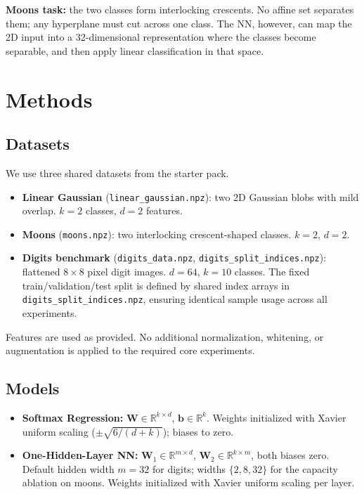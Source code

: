 \documentclass[11pt]{article}
\newcommand{\R}{\mathbb{R}}
\newcommand{\vb}{\mathbf{b}}
\newcommand{\mW}{\mathbf{W}}
\begin{document}
\textbf{Moons task:} the two classes form interlocking crescents.
No affine set separates them; any hyperplane must cut across one class.
The NN, however, can map the 2D input into a 32-dimensional representation where the
classes become separable, and then apply linear classification in that space.


\section{Methods}

\subsection{Datasets}

We use three shared datasets from the starter pack.

\begin{itemize}[leftmargin=*]
    \item \textbf{Linear Gaussian} (\texttt{linear\_gaussian.npz}): two 2D Gaussian
          blobs with mild overlap. $k=2$ classes, $d=2$ features.
    \item \textbf{Moons} (\texttt{moons.npz}): two interlocking crescent-shaped classes.
          $k=2$, $d=2$.
    \item \textbf{Digits benchmark} (\texttt{digits\_data.npz},
          \texttt{digits\_split\_indices.npz}): flattened $8{\times}8$ pixel digit images.
          $d=64$, $k=10$ classes. The fixed train/validation/test split is defined by
          shared index arrays in \texttt{digits\_split\_indices.npz}, ensuring identical
          sample usage across all experiments.
\end{itemize}

Features are used as provided. No additional normalization, whitening, or augmentation
is applied to the required core experiments.

\subsection{Models}

\begin{itemize}[leftmargin=*]
    \item \textbf{Softmax Regression:} $\mW \in \R^{k \times d}$, $\vb \in \R^k$.
          Weights initialized with Xavier uniform scaling
          ($\pm\sqrt{6/(d+k)}$); biases to zero.
    \item \textbf{One-Hidden-Layer NN:} $\mathbf{W}_1 \in \R^{m \times d}$,
          $\mathbf{W}_2 \in \R^{k \times m}$, both biases zero.
          Default hidden width $m = 32$ for digits; widths $\{2, 8, 32\}$ for the
          capacity ablation on moons.
          Weights initialized with Xavier uniform scaling per layer.
\end{itemize}
\end{document}
